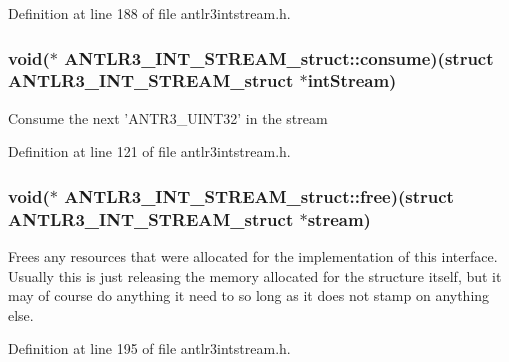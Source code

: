 Definition at line 188 of file antlr3intstream.\-h.

\hypertarget{struct_a_n_t_l_r3___i_n_t___s_t_r_e_a_m__struct_a94cc34ff782903d0d2b91595f308062a}{
\subsubsection[{consume}]{\setlength{\rightskip}{0pt plus 5cm}void($\ast$ A\-N\-T\-L\-R3\-\_\-\-I\-N\-T\-\_\-\-S\-T\-R\-E\-A\-M\-\_\-struct\-::consume)(struct {\bf A\-N\-T\-L\-R3\-\_\-\-I\-N\-T\-\_\-\-S\-T\-R\-E\-A\-M\-\_\-struct} $\ast$int\-Stream)}}\label{struct_a_n_t_l_r3___i_n_t___s_t_r_e_a_m__struct_a94cc34ff782903d0d2b91595f308062a}
Consume the next 'A\-N\-T\-R3\-\_\-\-U\-I\-N\-T32' in the stream 

Definition at line 121 of file antlr3intstream.\-h.

\hypertarget{struct_a_n_t_l_r3___i_n_t___s_t_r_e_a_m__struct_ae4fa4d24c35c6d5975aef2fd0bca71a0}{
\subsubsection[{free}]{\setlength{\rightskip}{0pt plus 5cm}void($\ast$ A\-N\-T\-L\-R3\-\_\-\-I\-N\-T\-\_\-\-S\-T\-R\-E\-A\-M\-\_\-struct\-::free)(struct {\bf A\-N\-T\-L\-R3\-\_\-\-I\-N\-T\-\_\-\-S\-T\-R\-E\-A\-M\-\_\-struct} $\ast$stream)}}\label{struct_a_n_t_l_r3___i_n_t___s_t_r_e_a_m__struct_ae4fa4d24c35c6d5975aef2fd0bca71a0}
Frees any resources that were allocated for the implementation of this interface. Usually this is just releasing the memory allocated for the structure itself, but it may of course do anything it need to so long as it does not stamp on anything else. 

Definition at line 195 of file antlr3intstream.\-h.

